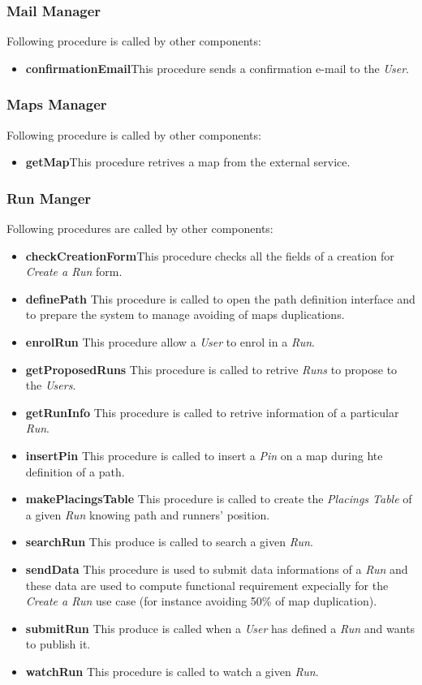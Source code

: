 \subsubsection{Mail Manager}
Following procedure is called by other components:
\begin{itemize}
  \item \textbf{confirmationEmail}\quad This procedure sends a confirmation e-mail to the \textit{User}.
\end{itemize}

\subsubsection{Maps Manager}
Following procedure is called by other components:
\begin{itemize}
  \item \textbf{getMap}\quad This procedure retrives a map from the external service.
\end{itemize}

\subsubsection{Run Manger}
Following procedures are called by other components:
\begin{itemize}
  \item \textbf{checkCreationForm}\quad This procedure checks all the fields of a creation for \textit{Create a Run} form.
  \item \textbf{definePath} \quad This procedure is called to open the path definition interface and to prepare the system to manage avoiding of maps duplications.
  \item \textbf{enrolRun} \quad This procedure allow a \textit{User} to enrol in a \textit{Run}.
  \item \textbf{getProposedRuns} \quad This procedure is called to retrive \textit{Runs} to propose to the \textit{Users}.
  \item \textbf{getRunInfo} \quad This procedure is called to retrive information of a particular \textit{Run}.
  \item \textbf{insertPin} \quad This procedure is called to insert a \textit{Pin} on a map during hte definition of a path.
  \item \textbf{makePlacingsTable} \quad This procedure is called to create the \textit{Placings Table} of a given \textit{Run} knowing path and runners' position.
  \item \textbf{searchRun} \quad This produce is called to search a given \textit{Run}.
  \item \textbf{sendData} \quad This procedure is used to submit data informations of a \textit{Run} and these data are used to compute functional requirement expecially for the \textit{Create a Run} use case (for instance avoiding 50\% of map duplication).
  \item \textbf{submitRun} \quad This produce is called when a \textit{User} has defined a \textit{Run} and wants to publish it.
  \item \textbf{watchRun} \quad This procedure is called to watch a given \textit{Run}.
\end{itemize}


